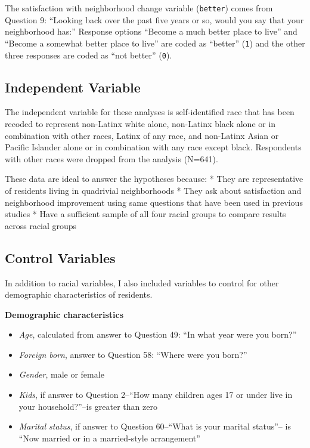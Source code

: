\documentclass[]{article}
\theoremstyle{definition}
\theoremstyle{definition}
\theoremstyle{definition}
\theoremstyle{remark}
\begin{document}
The satisfaction with neighborhood change variable (\texttt{better})
comes from Question 9: ``Looking back over the past five years or so,
would you say that your neighborhood has:'' Response options ``Become a
much better place to live'' and ``Become a somewhat better place to
live'' are coded as ``better'' (\texttt{1}) and the other three
responses are coded as ``not better'' (\texttt{0}).

\subsection{Independent Variable}\label{independent-variable}

The independent variable for these analyses is self-identified race that
has been recoded to represent non-Latinx white alone, non-Latinx black
alone or in combination with other races, Latinx of any race, and
non-Latinx Asian or Pacific Islander alone or in combination with any
race except black. Respondents with other races were dropped from the
analysis (N=641).

These data are ideal to answer the hypotheses because: * They are
representative of residents living in quadrivial neighborhoods * They
ask about satisfaction and neighborhood improvement using same questions
that have been used in previous studies * Have a sufficient sample of
all four racial groups to compare results across racial groups

\subsection{Control Variables}\label{control-variables}

In addition to racial variables, I also included variables to control
for other demographic characteristics of residents.

\textbf{Demographic characteristics}

\begin{itemize}
\item
  \emph{Age}, calculated from answer to Question 49: ``In what year were
  you born?''
\item
  \emph{Foreign born}, answer to Question 58: ``Where were you born?''
\item
  \emph{Gender}, male or female
\item
  \emph{Kids}, if answer to Question 2--``How many children ages 17 or
  under live in your household?''--is greater than zero
\item
  \emph{Marital status}, if answer to Question 60--``What is your
  marital status''-- is ``Now married or in a married-style
  arrangement''
\end{itemize}
\end{document}
